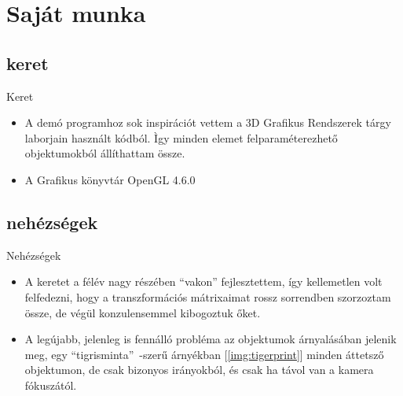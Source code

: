 \documentclass{beamer}
\begin{document}
\section{Saját munka}
\subsection{keret}
\begin{frame}{Keret}
	\begin{itemize}
		\item A demó programhoz sok inspirációt vettem a 3D Grafikus Rendszerek tárgy laborjain használt kódból. \`Igy minden elemet felparaméterezhető objektumokból állíthattam össze.
		\item A Grafikus könyvtár OpenGL 4.6.0
	\end{itemize}
\end{frame}
\subsection{nehézségek}
\begin{frame}{Nehézségek}
	\begin{itemize}
		\item A keretet a félév nagy részében ``vakon'' fejlesztettem, így kellemetlen volt felfedezni, hogy a transzformációs mátrixaimat rossz sorrendben szorzoztam össze, de végül konzulensemmel kibogoztuk őket.
		\item A legújabb, jelenleg is fennálló probléma az objektumok árnyalásában jelenik meg, egy ``tigrisminta''~-szerű árnyékban [\ref{img:tigerprint}] minden áttetsző objektumon, de csak bizonyos irányokból, és csak ha távol van a kamera fókuszától.
	\end{itemize}
\end{frame}
\end{document}
